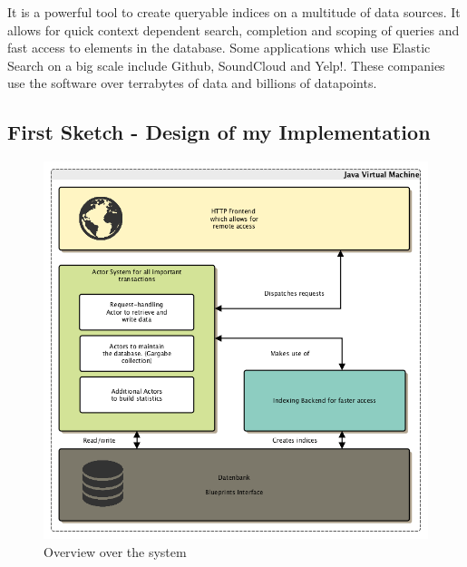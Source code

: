 \documentclass[twoside, 11pt]{scrartcl}
\begin{document}
It is a powerful tool to create queryable indices on a multitude of data sources. It allows for quick context dependent search, completion and scoping of queries and fast access to elements in the database.
Some applications which use Elastic Search on a big scale include Github, SoundCloud and Yelp!. These companies use the software over terrabytes of data and billions of datapoints. \cite{link:esUses}
	
\subsection{First Sketch - Design of my Implementation}
\label{sec:firstSketch}

\begin{figure}[h!]		
 	\includegraphics[scale=0.5]{figures/roughOverview.png}
	\caption{Overview over the system}
	\label{fig:roughOverview}
\end{figure}
\end{document}
